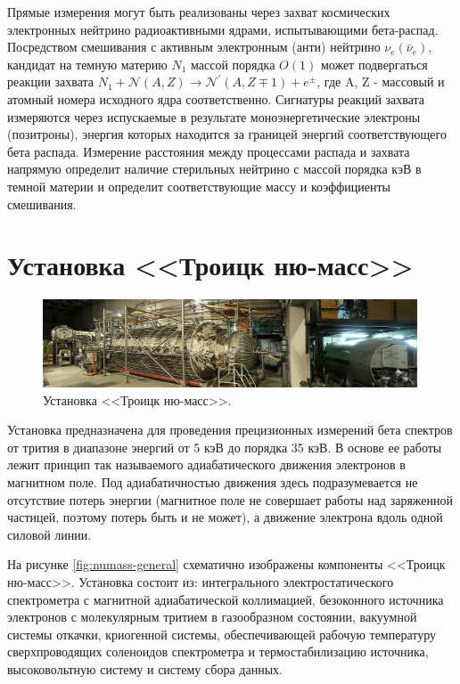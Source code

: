 \documentclass[a4paper,14pt]{extreport}
\begin{document}
Прямые измерения могут быть реализованы через захват космических электронных нейтрино радиоактивными ядрами, испытывающими бета-распад\cite{1005.3351}\cite{1009.5870}. Посредством смешивания с активным электронным (анти) нейтрино $\nu_e (\bar{\nu}_{e})$, кандидат на темную материю $ {N}^{}_{1} $ массой порядка $O(1)$ может подвергаться реакции захвата $ {N}^{}_{1} + \mathcal{N}(A,Z) \to \mathcal{N}^\prime (A, Z\mp1) + e^{\pm} $, где A, Z - массовый и атомный номера исходного ядра соответственно. Сигнатуры реакций захвата измеряются через испускаемые в результате моноэнергетические электроны (позитроны), энергия которых находится за границей энергий соответствующего бета распада. Измерение расстояния между процессами распада и захвата напрямую определит наличие стерильных нейтрино с массой порядка кэВ в темной материи и определит соответствующие массу и коэффициенты смешивания.

\chapter{Установка <<Троицк ню-масс>>}

\begin{figure}
  \centering
  \includegraphics[width = 0.99\textwidth]{img/nu_mass_setup/setup.jpg}
    \caption{Установка <<Троицк ню-масс>>.}
    \label{fig:numass-photo}
\end{figure}

Установка предназначена для проведения прецизионных измерений бета спектров от трития в диапазоне энергий от 5 кэВ до порядка 35 кэВ. В основе ее работы лежит 
принцип так называемого адиабатического движения электронов в магнитном поле. Под адиабатичностью движения здесь подразумевается не отсутствие потерь энергии (магнитное поле не совершает работы над заряженной частицей, поэтому потерь быть и не может), а движение электрона вдоль одной силовой линии.


На рисунке \ref{fig:numass-general} схематично изображены компоненты <<Троицк ню-масс>>. Установка состоит из: интегрального электростатического спектрометра с магнитной адиабатической коллимацией, безоконного источника электронов с молекулярным тритием в газообразном состоянии, вакуумной системы откачки, криогенной системы, обеспечивающей рабочую температуру сверхпроводящих соленоидов спектрометра и термостабилизацию источника, высоковольтную систему и систему сбора данных.
\end{document}

